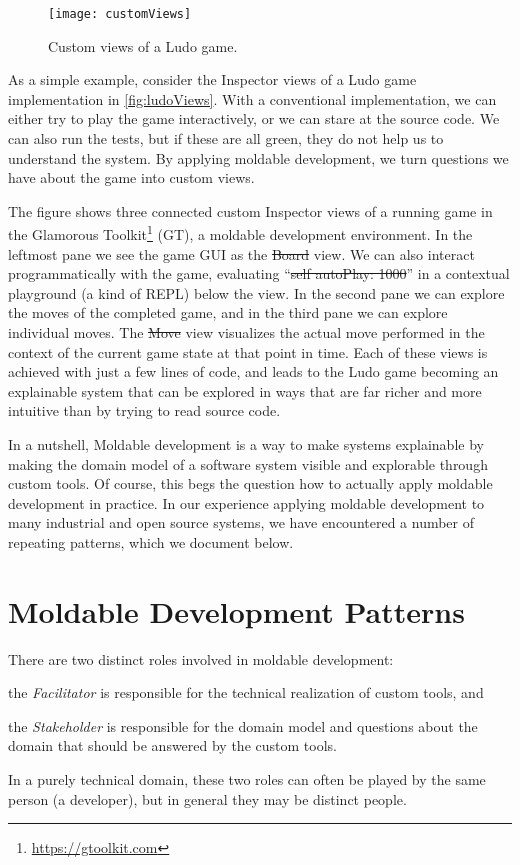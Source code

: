 \documentclass[sigconf]{acmart}
\newcommand{\GT}{GT\xspace} %
\begin{document}
\begin{figure}[h]
  \texttt{[image: customViews]}
  \caption{Custom views of a Ludo game.}
  \label{fig:ludoViews}
\end{figure}

As a simple example, consider the Inspector views of a Ludo game implementation in \autoref{fig:ludoViews}.
With a conventional implementation, we can either try to play the game interactively, or we can stare at the source code.
We can also run the tests, but if these are all green, they do not help us to understand the system.
By applying moldable development, we turn questions we have about the game into custom views.

The figure shows three connected custom Inspector views of a running game in the Glamorous Toolkit\footnote{\url{https://gtoolkit.com}} (\GT), a moldable development environment.
In the leftmost pane we see the game GUI as the \st{Board} view.
We can also interact programmatically with the game, evaluating ``\st{self autoPlay: 1000}'' in a contextual playground (a kind of REPL) below the view.
In the second pane we can explore the moves of  the completed game, and in the third pane we can explore individual moves.
The \st{Move} view visualizes the actual move performed in the context of the current game state at that point in time.
Each of these views is achieved with just a few lines of code, and leads to the Ludo game becoming an explainable system that can be explored in ways that are far richer and more intuitive than by trying to read source code.

In a nutshell, Moldable development is a way to make systems explainable by making the domain model of a software system visible and explorable through custom tools.
Of course, this begs the question how to actually apply moldable development in practice.
In our experience applying moldable development to many industrial and open source systems, we have encountered a number of repeating patterns, which we document below.

\section{Moldable Development Patterns}

There are two distinct roles involved in moldable development:
\begin{inparaenum}[(i)]
\item the \emph{Facilitator} is responsible for the technical realization of custom tools, and
\item the \emph{Stakeholder} is responsible for the domain model and questions about the domain that should be answered by the custom tools.
\end{inparaenum}
In a purely technical domain, these two roles can often be played by the same person (\ie a developer), but in general they may be distinct people.
\end{document}
